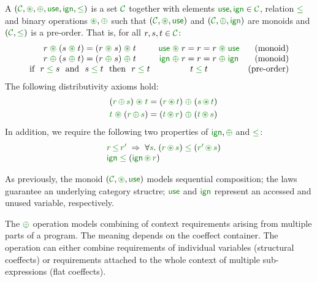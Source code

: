 \begin{definition}
A \emph{} $(\C, \cseq, \cpar, \cunit, \czero, \cleq)$ is a set 
$\C$ together with elements $\cunit, \czero \in \C$, relation $\cleq$ and binary operations 
$\cseq, \cpar$ such that $(\C, \cseq, \cunit)$ and $(\C, \cpar, \czero)$ are monoids and
$(\C, \cleq)$ is a pre-order. That is, for all $r,s,t\in \C$:
%
\begin{equation*}
\begin{array}{ccr}
r \;\cseq\; (s \;\cseq\; t) = (r \;\cseq\; s) \;\cseq\; t  &
\cunit \;\cseq\; r = r = r \;\cseq\; \cunit &
\textnormal{(monoid)}   
\\
r \;\cpar\; (s \;\cpar\; t) = (r \;\cpar\; s) \;\cpar\; t &
\czero \;\cpar\; r = r = r \;\cpar\; \czero &
\textnormal{(monoid)}   
\\
\textnormal{if}~~r\; \cleq\; s ~~\textnormal{and}~~s\; \cleq\; t~~\textnormal{then}~~r\; \cleq\; t&
t\; \cleq\; t &
\textnormal{(pre-order)}   
\\
\end{array}
\end{equation*}
%
The following distributivity axioms hold:
\begin{align*}
\quad (\cclrd{r}\, \cpar\, \cclrd{s}) \;\cseq\; \cclrd{t} & = (\cclrd{r} \,\cseq\, \cclrd{t}) \;\cpar\; (\cclrd{s}\, \cseq\, \cclrd{t}) \\
\quad \cclrd{t} \;\cseq\; (\cclrd{r}\, \cpar\, \cclrd{s}) & = (\cclrd{t} \,\cseq\, \cclrd{r}) \;\cpar\; (\cclrd{t}\, \cseq\, \cclrd{s})
\end{align*}
%
In addition, we require the following two properties of $\czero, \cpar$ and $\cleq$:
\begin{equation*}
\begin{array}{l}
 \quad \cclrd{r}\,\cleq\,\cclrd{r'} \; \Rightarrow \; \forall\cclrd{s}.\;(\cclrd{r}\,\cseq\,\cclrd{s})\;\cleq\;(\cclrd{r'}\,\cseq\,\cclrd{s}) \\
 \quad \czero\;\cleq\;(\czero\,\cseq\,\cclrd{r})
\end{array}
\end{equation*}
\end{definition}

\noindent
As previously, the monoid $(\C,\cseq,\cunit)$ models sequential composition; the laws guarantee
an underlying category structre; $\cunit$ and $\czero$ represent an accessed and unused variable, 
respectively.

The $\cpar$ operation models combining of context requirements arising from multiple parts of a 
program. The meaning depends on the coeffect container. The operation can either combine requirements
of individual variables (structural coeffects) or requirements attached to the whole context of 
multiple sub-exp\-ressions (flat coeffects).


